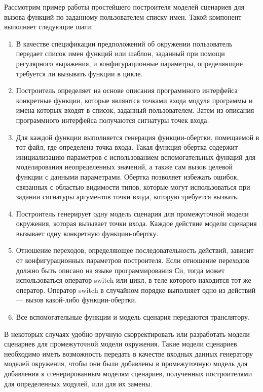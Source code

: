 Рассмотрим пример работы простейшего построителя моделей сценариев для вызова функций по заданному пользователем списку имен.
Такой компонент выполняет следующие шаги:
\begin{enumerate}
    \item В качестве спецификации предположений об окружении пользователь передает список имен функций или шаблон, заданный при помощи регулярного выражения, и конфигурационные параметры, определяющие требуется ли вызывать функции в цикле.
    \item Построитель определяет на основе описания программного интерфейса конкретные функции, которые являются точками входа модуля программы и имена которых входят в список, заданный пользователем.
    Затем из описания программного интерфейса получаются сигнатуры точек входа.
    \item Для каждой функции выполняется генерация функции-обертки, помещаемой в тот файл, где определена точка входа. 
    Такая функция-обертка содержит инициализацию параметров с использованием вспомогательных функций для моделирования неопределенных значений, а также сам вызов целевой функции с данными параметрами.
    Обертка позволяет избежать ошибок, связанных с областью видимости типов, которые могут использоваться при задании сигнатуры аргументов точки входа, которую требуется вызвать.
    \item Построитель генерирует одну модель сценария для промежуточной модели окружения, которая вызывает точки входа. 
    Каждое действие модели сценария вызывает одну конкретную функцию-обертку.
    \item Отношение переходов, определяющее последовательность действий, зависит от конфигурационных параметров построителя.
    Если отношение переходов должно быть описано на языке программирования Си, тогда может использоваться оператор switch или цикл, в теле которого находится тот же оператор.
    Оператор switch в случайном порядке выполняет одно из действий --- вызов какой-либо функции-обертки.
    \item Все вспомогательные функции и модель сценария передаются транслятору.
\end{enumerate}

В некоторых случаях удобно вручную скорректировать или разработать модели сценариев для промежуточной модели окружения.
Такие модели сценариев необходимо иметь возможность передать в качестве входных данных генератору моделей окружения, чтобы они были добавлены в промежуточную модель для добавления к сгенерированным моделям сценариев, полученных построителями для определенных модулей, или для их замены.

